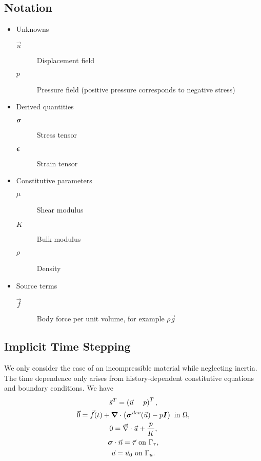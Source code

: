 \subsection{Notation}
\begin{itemize}
\item Unknowns
  \begin{description}
  \item[$\vec{u}$] Displacement field
  \item[$p$] Pressure field (positive pressure corresponds to negative stress)
  \end{description}
\item Derived quantities
  \begin{description}
    \item[$\bm{\sigma}$] Stress tensor
    \item[$\bm{\epsilon}$] Strain tensor
  \end{description}
\item Constitutive parameters
  \begin{description}
  \item[$\mu$] Shear modulus
  \item[$K$] Bulk modulus
  \item[$\rho$] Density
  \end{description}
\item Source terms
  \begin{description}
    \item[$\vec{f}$] Body force per unit volume, for example $\rho \vec{g}$
  \end{description}
\end{itemize}


\subsection{Implicit Time Stepping}

We only consider the case of an incompressible material while
neglecting inertia. The time dependence only arises from
history-dependent constitutive equations and boundary conditions. We
have
\begin{gather}
  \vec{s}^T = \left( \vec{u} \quad \ p \right)^T, \\
  \vec{0} = \vec{f}(t) + \bm{\nabla} \cdot \left(\bm{\sigma}^\mathit{dev}(\vec{u}) - p\bm{I}\right) \text{ in }\Omega, \\
  0 = \vec{\nabla} \cdot \vec{u} + \frac{p}{K}, \\
  \bm{\sigma} \cdot \vec{n} = \vec{\tau} \text{ on }\Gamma_\tau, \\
  \vec{u} = \vec{u}_0 \text{ on }\Gamma_u.
\end{gather}

